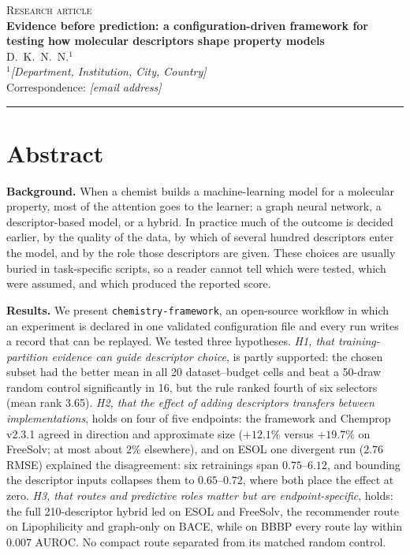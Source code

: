 \documentclass[10pt,a4paper]{article}
\newcommand{\framework}{\texttt{chemistry-framework}}
\begin{document}
\begin{flushleft}
{\small\scshape Research article}\\[6pt]
{\LARGE\bfseries Evidence before prediction: a configuration-driven framework for testing how molecular descriptors shape property models}\\[14pt]
{\large D.~K.~N.~N.}$^{1}$\\[4pt]
{\small $^{1}$\emph{[Department, Institution, City, Country]}}\\[2pt]
{\small Correspondence: \emph{[email address]}}\\[6pt]
\end{flushleft}

\vspace{2pt}
\hrule
\vspace{10pt}

\section*{Abstract}

\noindent\textbf{Background.} When a chemist builds a machine-learning model for a molecular property, most of the attention goes to the learner: a graph neural network, a descriptor-based model, or a hybrid. In practice much of the outcome is decided earlier, by the quality of the data, by which of several hundred descriptors enter the model, and by the role those descriptors are given. These choices are usually buried in task-specific scripts, so a reader cannot tell which were tested, which were assumed, and which produced the reported score.

\noindent\textbf{Results.} We present \framework, an open-source workflow in which an experiment is declared in one validated configuration file and every run writes a record that can be replayed. We tested three hypotheses. \emph{H1, that training-partition evidence can guide descriptor choice}, is partly supported: the chosen subset had the better mean in all 20 dataset--budget cells and beat a 50-draw random control significantly in 16, but the rule ranked fourth of six selectors (mean rank 3.65). \emph{H2, that the effect of adding descriptors transfers between implementations}, holds on four of five endpoints: the framework and Chemprop v2.3.1 agreed in direction and approximate size ($+12.1\%$ versus $+19.7\%$ on FreeSolv; at most about $2\%$ elsewhere), and on ESOL one divergent run ($2.76$ RMSE) explained the disagreement: six retrainings span $0.75$--$6.12$, and bounding the descriptor inputs collapses them to $0.65$--$0.72$, where both place the effect at zero. \emph{H3, that routes and predictive roles matter but are endpoint-specific}, holds: the full 210-descriptor hybrid led on ESOL and FreeSolv, the recommender route on Lipophilicity and graph-only on BACE, while on BBBP every route lay within $0.007$ AUROC. No compact route separated from its matched random control.
\end{document}
